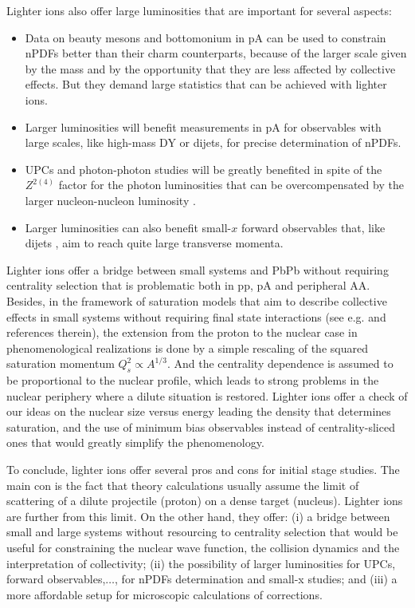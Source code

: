 \documentclass[../report.tex]{subfiles}
\begin{document}
Lighter ions also offer large luminosities that are important for several aspects:
\begin{itemize}
\item Data on beauty mesons and bottomonium in pA can be used to constrain nPDFs \cite{Kusina:2017gkz} better than their charm counterparts, because of the larger scale given by the mass and by the opportunity that they are less affected by collective effects. But they demand large statistics that can be achieved with lighter ions.
\item Larger luminosities will benefit measurements in pA for observables with large scales, like high-mass DY or dijets, for precise determination of nPDFs.
\item UPCs and photon-photon studies \cite{Baltz:2007kq} will be greatly benefited in spite of the $Z^{2(4)}$ factor for the photon luminosities that can be overcompensated by the larger nucleon-nucleon luminosity .
\item Larger luminosities can also benefit small-$x$ forward observables that, like dijets \cite{Dainese:2016gch}, aim to reach quite large transverse momenta.
\end{itemize}

Lighter ions offer a bridge between small systems and PbPb without requiring centrality selection that is problematic both in pp, pA and peripheral AA. 
Besides, in the framework of saturation models \cite{Gelis:2010nm} that aim to describe collective effects in small systems without requiring final state interactions (see e.g. \cite{Kovner:2016wsq} and references therein), the extension from the proton to the nuclear case in phenomenological realizations  is done by a simple rescaling of the squared saturation momentum $Q_s^2\propto A^{1/3}$. And the centrality dependence is assumed to be proportional to the nuclear profile, which leads to strong problems in the nuclear periphery where a dilute situation is restored. Lighter ions offer a check of our ideas on the
nuclear size versus energy leading
the density that determines saturation, and the use of minimum bias observables
instead of centrality-sliced ones that
would greatly simplify the phenomenology.

To conclude, lighter ions offer several pros and cons for initial stage studies. The main con is the fact that theory calculations usually assume the limit of scattering of a dilute projectile (proton) on a dense target (nucleus). Lighter ions are further from this limit. On the other hand, they offer: (i) a bridge between small and large systems without resourcing to
centrality selection that would be useful for constraining the nuclear wave function, the
collision dynamics and the interpretation of collectivity;
(ii) the possibility of larger luminosities for UPCs, forward observables,$\dots$,
for nPDFs determination and small-x studies; and (iii)
a more affordable setup for microscopic calculations of corrections.
\end{document}

